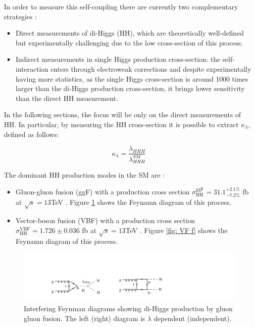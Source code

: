 In order to measure this self-coupling there are currently two complementary strategies \cite{talklucacometa}:
\begin{itemize}
    \item Direct measurements of di-Higgs (HH), which are theoretically well-defined but experimentally challenging due to the low cross-section of this process.
    \item Indirect measurements in single Higgs production cross-section: the self-interaction enters through electroweak corrections and despite experimentally having more statistics, as the single Higgs cross-section is around 1000 times larger than the di-Higgs production cross-section, it brings lower sensitivity than the direct HH measurement.
\end{itemize}

In the following sections, the focus will be only on the direct measurements of HH. In particular, by measuring the HH cross-section it is possible to extract $\kappa_\lambda$, defined as follows:

\begin{equation}
    \kappa_\lambda=\frac{\lambda_{HHH}}{\lambda^{SM}_{HHH}}
\end{equation}

\newpage

\noindent The dominant HH production modes in the SM are \cite{ANRun2}:
\begin{itemize}
    \item Gluon-gluon fusion (ggF) with a production cross section $\sigma^{\text{ggF}}_{\text{HH}}=31.1^{+2.1\%}_{-7.2\%}$ fb at $\sqrt{s}=13$TeV \cite{Run2res}. Figure \ref{fig: GGF f} shows the Feynamn diagram of this process.
    \item Vector-boson fusion (VBF) with a production cross section $\sigma^{\text{VBF}}_{\text{HH}}= 1.726 \pm 0.036$ fb at $\sqrt{s}=13$TeV \cite{Run2res}. Figure \ref{fig: VF f} shows the Feynamn diagram of this process.
\end{itemize}

\begin{figure}[hbt]
    \centering
    \includegraphics[width=1\linewidth]{Images/5.SPANet/gluon gluon fusion.pdf}
    \caption{Interfering Feynman diagrams showing di-Higgs production by gluon gluon fusion. The left (right) diagram is $\lambda$ dependent (independent).}
    \label{fig: GGF f}
\end{figure}

